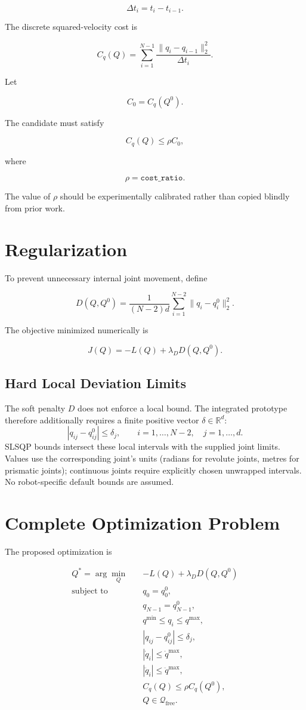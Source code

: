 \documentclass[11pt]{article}
\begin{document}
\[
\Delta t_i =
t_i-t_{i-1}.
\]

The discrete squared-velocity cost is

\[
C_q(Q)
=
\sum_{i=1}^{N-1}
\frac{
\|q_i-q_{i-1}\|_2^2
}{
\Delta t_i
}.
\]

Let

\[
C_0 =
C_q(Q^0).
\]

The candidate must satisfy

\[
C_q(Q)
\le
\rho C_0,
\]

where

\[
\rho =
\texttt{cost\_ratio}.
\]

The value of $\rho$ should be experimentally calibrated rather
than copied blindly from prior work.

\section{Regularization}

To prevent unnecessary internal joint movement, define

\[
D(Q,Q^0)
=
\frac{1}{(N-2)d}
\sum_{i=1}^{N-2}
\|q_i-q_i^0\|_2^2.
\]

The objective minimized numerically is

\[
J(Q)
=
-L(Q)
+
\lambda_DD(Q,Q^0).
\]

\subsection{Hard Local Deviation Limits}

The soft penalty $D$ does not enforce a local bound. The integrated prototype
therefore additionally requires a finite positive vector $\delta\in\mathbb R^d$:
\[
 |q_{ij}-q^0_{ij}|\le\delta_j,
 \qquad i=1,\ldots,N-2,\quad j=1,\ldots,d.
\]
SLSQP bounds intersect these local intervals with the supplied joint limits.
Values use the corresponding joint's units (radians for revolute joints,
metres for prismatic joints); continuous joints require explicitly chosen
unwrapped intervals. No robot-specific default bounds are assumed.

\section{Complete Optimization Problem}

The proposed optimization is

\[
\begin{aligned}
Q^*
=
\arg\min_Q
\quad&
-L(Q)
+
\lambda_DD(Q,Q^0)
\\
\text{subject to}\quad
&
q_0=q_0^0,
\\
&
q_{N-1}=q_{N-1}^0,
\\
&
q^{\min}\le q_i\le q^{\max},
\\
&
|q_{ij}-q^0_{ij}|\le\delta_j,
\\
&
|\dot q_i|
\le
\dot q^{\max},
\\
&
|\ddot q_i|
\le
\ddot q^{\max},
\\
&
C_q(Q)
\le
\rho C_q(Q^0),
\\
&
Q\in\mathcal Q_{\mathrm{free}}.
\end{aligned}
\]
\end{document}
